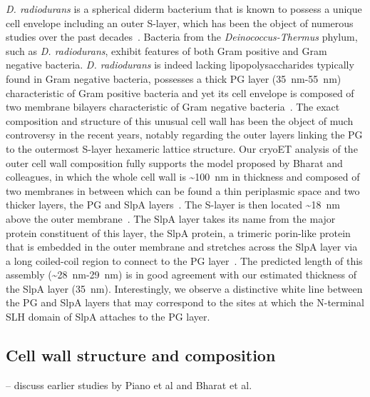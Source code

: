 \textit{D. radiodurans} is a spherical diderm bacterium that is known to possess a unique cell envelope including an outer S-layer, which has been the object of numerous studies over the past decades~\cite{vonkugelgenMultidomainConnectorLinks2022,workMorphologyChemistryCell1968,rothfussInvolvementSlayerProteins2006,vonkugelgenInterdigitatedImmunoglobulinArrays2023,farciSDBCActiveQuenching2023,farciStructuredOrganizationDeinococcus2022,farciCryoEMStructureSlayer2022,farciStructuralAnalysisArchitecture2021,baumeisterThreedimensionalStructureRegular1986,baumeisterStructureCellEnvelope1981}.
Bacteria from the \textit{Deinococcus-Thermus} phylum, such as \textit{D. radiodurans}, exhibit features of both Gram positive and Gram negative bacteria.
\textit{D. radiodurans} is indeed lacking lipopolysaccharides typically found in Gram negative bacteria, possesses a thick PG layer (\qty{35}{nm}-\qty{55}{nm}) characteristic of Gram positive bacteria and yet its cell envelope is composed of two membrane bilayers characteristic of Gram negative bacteria~\cite{guptaOriginDidermGramnegative2011}.
The exact composition and structure of this unusual cell wall has been the object of much controversy in the recent years, notably regarding the outer layers linking the PG to the outermost S-layer hexameric lattice structure.
Our cryoET analysis of the outer cell wall composition fully supports the model proposed by Bharat and colleagues, in which the whole cell wall is \sim\qty{100}{nm} in thickness and composed of two membranes in between which can be found a thin periplasmic space and two thicker layers, the PG and SlpA layers~\cite{vonkugelgenMultidomainConnectorLinks2022}.
The S-layer is then located \sim\qty{18}{nm} above the outer membrane~\cite{vonkugelgenInterdigitatedImmunoglobulinArrays2023}.
The SlpA layer takes its name from the major protein constituent of this layer, the SlpA protein, a trimeric porin-like protein that is embedded in the outer membrane and stretches across the SlpA layer via a long coiled-coil region to connect to the PG layer~\cite{vonkugelgenMultidomainConnectorLinks2022}.
The predicted length of this assembly (\sim\qty{28}{nm}-\qty{29}{nm}) is in good agreement with our estimated thickness of the SlpA layer (\qty{35}{nm}).
Interestingly, we observe a distinctive white line between the PG and SlpA layers that may correspond to the sites at which the N-terminal SLH domain of SlpA attaches to the PG layer.

\subsection{Cell wall structure and composition} -- discuss earlier studies by Piano et al and Bharat et al.

